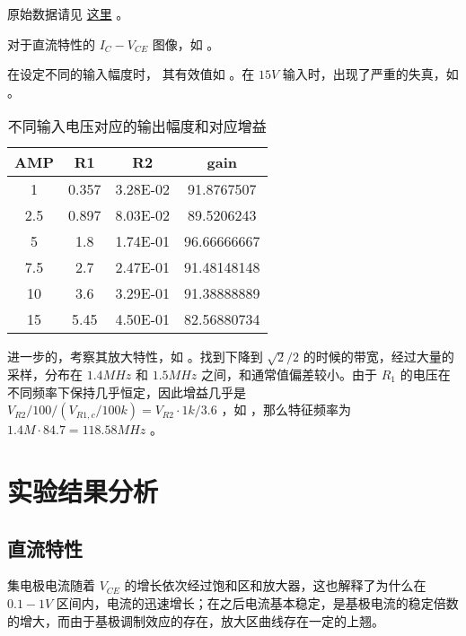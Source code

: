 \documentclass[lang=cn,11pt,a4paper,cite=authoryear]{elegantpaper}
\begin{document}
原始数据请见 \href{https://github.com/PannenetsF/Mirco-Electronic-Device-Experiment/tree/main/homework/hw08}{这里} 。

对于直流特性的 \(I_C - V_{CE}\) 图像，如  。


在设定不同的输入幅度时， 其有效值如 。在 \(15 V\) 输入时，出现了严重的失真，如  。

\begin{table}[htp]
    \caption{不同输入电压对应的输出幅度和对应增益}
    \centering
    \label{t1}
    \begin{tabular}    {cccc}
    \toprule
    AMP & R1    & R2       & gain        \\
    \midrule
1   & 0.357 & 3.28E-02 & 91.8767507  \\
2.5 & 0.897 & 8.03E-02 & 89.5206243  \\
5   & 1.8   & 1.74E-01 & 96.66666667 \\
7.5 & 2.7   & 2.47E-01 & 91.48148148 \\
10  & 3.6   & 3.29E-01 & 91.38888889 \\
15  & 5.45  & 4.50E-01 & 82.56880734 \\
    \bottomrule
    \end{tabular}
\end{table}



进一步的，考察其放大特性，如  。找到下降到 \(\sqrt{2}/2\) 的时候的带宽，经过大量的采样，分布在 \(1.4 MHz\) 和 \(1.5 MHz\) 之间，和通常值偏差较小。由于 \(R_1\) 的电压在不同频率下保持几乎恒定，因此增益几乎是 \(V_{R2}/100 / (V_{R1,c}/100k) = V_{R2} \cdot 1k / 3.6\) ，如  ，那么特征频率为 \(1.4 M \cdot 84.7 = 118.58 MHz \) 。




\section{实验结果分析}

\subsection{直流特性}

集电极电流随着 \(V_{CE}\) 的增长依次经过饱和区和放大器，这也解释了为什么在 \(0.1 - 1 V\) 区间内，电流的迅速增长；在之后电流基本稳定，是基极电流的稳定倍数的增大，而由于基极调制效应的存在，放大区曲线存在一定的上翘。
\end{document}
